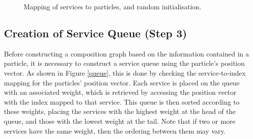 \documentclass{llncs}
\begin{document}
\begin{figure}[h]
\centerline{
}
 \caption{Mapping of services to particles, and random initialisation.}
 \label{mapping}
\end{figure}

\subsection{Creation of Service Queue (Step 3)}

Before constructing a composition graph based on the information contained in a particle, it is necessary to construct a service queue using the particle's position vector. As shown in Figure \ref{queue}, this is done by checking the service-to-index mapping for the particles' position vector. Each service is placed on the queue with an associated weight, which is retrieved by accessing the position vector with the index mapped to that service. This queue is then sorted according to these weights, placing the services with the highest weight at the head of the queue, and those with the lowest weight at the tail. Note that if two or more services have the same weight, then the ordering between them may vary.
\end{document}
